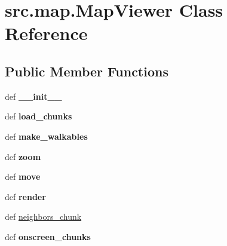 \hypertarget{classsrc_1_1map_1_1_map_viewer}{\section{src.\-map.\-Map\-Viewer \-Class \-Reference}
\label{classsrc_1_1map_1_1_map_viewer}
}
\subsection*{\-Public \-Member \-Functions}
\begin{DoxyCompactItemize}
\item 
\hypertarget{classsrc_1_1map_1_1_map_viewer_a8997ec02710136f8bd6ebf59c63da281}{def {\bfseries \-\_\-\-\_\-init\-\_\-\-\_\-}}\label{classsrc_1_1map_1_1_map_viewer_a8997ec02710136f8bd6ebf59c63da281}

\item 
\hypertarget{classsrc_1_1map_1_1_map_viewer_a07a318fee6ef7bb30d191734e80a08ac}{def {\bfseries load\-\_\-chunks}}\label{classsrc_1_1map_1_1_map_viewer_a07a318fee6ef7bb30d191734e80a08ac}

\item 
\hypertarget{classsrc_1_1map_1_1_map_viewer_ac4f4367839d4e069c704342d75a5b763}{def {\bfseries make\-\_\-walkables}}\label{classsrc_1_1map_1_1_map_viewer_ac4f4367839d4e069c704342d75a5b763}

\item 
\hypertarget{classsrc_1_1map_1_1_map_viewer_a06296998c8b4ec64c1bfe1c5d16c0ca1}{def {\bfseries zoom}}\label{classsrc_1_1map_1_1_map_viewer_a06296998c8b4ec64c1bfe1c5d16c0ca1}

\item 
\hypertarget{classsrc_1_1map_1_1_map_viewer_ae8e7465bf22e8b6c624c57610d568091}{def {\bfseries move}}\label{classsrc_1_1map_1_1_map_viewer_ae8e7465bf22e8b6c624c57610d568091}

\item 
\hypertarget{classsrc_1_1map_1_1_map_viewer_a8b6327cbebaac59b59a07c8d48994f39}{def {\bfseries render}}\label{classsrc_1_1map_1_1_map_viewer_a8b6327cbebaac59b59a07c8d48994f39}

\item 
def \hyperlink{classsrc_1_1map_1_1_map_viewer_a79cdbef74bdb68268f83b1f6cac622e8}{neighbors\-\_\-chunk}
\item 
\hypertarget{classsrc_1_1map_1_1_map_viewer_a98ed63282992c7a07e1920ba58e54148}{def {\bfseries onscreen\-\_\-chunks}}\label{classsrc_1_1map_1_1_map_viewer_a98ed63282992c7a07e1920ba58e54148}


\end{DoxyCompactItemize}
